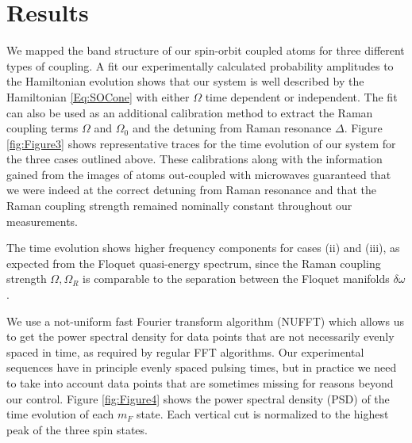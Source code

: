 \section{Results}

We mapped the band structure of our spin-orbit coupled atoms for three different types of coupling. A fit our experimentally calculated probability amplitudes to the Hamiltonian evolution shows that our system is well described by the Hamiltonian \ref{Eq:SOCone} with either $\Omega$ time dependent or independent. The fit can also be used as an additional calibration method to extract the Raman coupling terms $\Omega$ and $\Omega_0$ and the detuning from Raman resonance $\Delta$. Figure \ref{fig:Figure3} shows representative traces for the time evolution of our system for the three cases outlined above. These calibrations along with the information gained from the images of atoms out-coupled  with microwaves guaranteed that we were indeed at the correct detuning from Raman resonance and that the Raman coupling strength remained nominally constant throughout our measurements. 



The time evolution shows higher frequency components for cases (ii) and (iii), as expected from the Floquet quasi-energy spectrum, since the Raman coupling strength $\Omega, \Omega_R$ is comparable to the separation between the Floquet manifolds $\delta\omega$. 

We use a not-uniform fast Fourier transform algorithm (NUFFT) which allows us to get the power spectral density for data points that are not necessarily evenly spaced in time, as required by regular FFT algorithms. Our experimental sequences have in principle evenly spaced pulsing times,  but in practice we need to take into account data points that are sometimes missing for reasons beyond our control. Figure \ref{fig:Figure4} shows the power spectral density (PSD) of the time evolution of each $m_F$ state. Each vertical cut is normalized to the highest peak of the three spin states.
	
